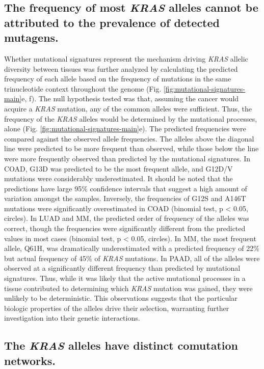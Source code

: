 \documentclass[english, 10pt, letterpaper]{article}
\newcommand{\KRAS}{\emph{KRAS}}
\begin{document}
\subsection*{The frequency of most \KRAS{} alleles cannot be attributed to the prevalence of detected mutagens.}

Whether mutational signatures represent the mechanism driving \KRAS{} allelic diversity between tissues was further analyzed by calculating the predicted frequency of each allele based on the frequency of mutations in the same trinucleotide context throughout the genome (Fig. \ref{fig:mutational-signatures-main}e, f).
The null hypothesis tested was that, assuming the cancer would acquire a \KRAS{} mutation, any of the common alleles were sufficient.
Thus, the frequency of the \KRAS{} alleles would be determined by the mutational processes, alone (Fig. \ref{fig:mutational-signatures-main}e).
The predicted frequencies were compared against the observed allele frequencies.
The alleles above the diagonal line were predicted to be more frequent than observed, while those below the line were more frequently observed than predicted by the mutational signatures.
In COAD, G13D was predicted to be the most frequent allele, and G12D/V mutations were considerably underestimated.
It should be noted that the predictions have large 95\% confidence intervals that suggest a high amount of variation amongst the samples.
Inversely, the frequencies of G12S and A146T mutations were significantly overestimated in COAD (binomial test, p < 0.05, circles).
In LUAD and MM, the predicted order of frequency of the alleles was correct, though the frequencies were significantly different from the predicted values in most cases (binomial test, p < 0.05, circles).
In MM, the most frequent allele, Q61H, was dramatically underestimated with a predicted frequency of 22\% but actual frequency of 45\% of \KRAS{} mutations.
In PAAD, all of the alleles were observed at a significantly different frequency than predicted by mutational signatures.
Thus, while it was likely that the active mutational processes in a tissue contributed to determining which \KRAS{} mutation was gained, they were unlikely to be deterministic.
This observations suggests that the particular biologic properties of the alleles drive their selection, warranting further investigation into their genetic interactions.


\subsection*{The \KRAS{} alleles have distinct comutation networks.}
\end{document}
